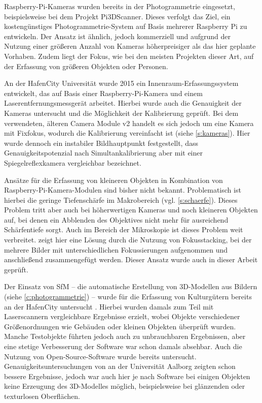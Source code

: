 \documentclass[./00PhotoBox]{subfiles}
\begin{document}
Raspberry-Pi-Kameras wurden bereits in der Photogrammetrie eingesetzt, beispielsweise bei dem Projekt Pi3DScanner. Dieses verfolgt das Ziel, ein kostengünstiges Photo\-grammetrie-System auf Basis mehrerer Raspberry Pi zu entwickeln. Der Ansatz ist ähnlich, jedoch kommerziell und aufgrund der Nutzung einer größeren Anzahl von Kameras höherpreisiger als das hier geplante Vorhaben. Zudem liegt der Fokus, wie bei den meisten Projekten dieser Art, auf der Erfassung von größeren Objekten oder Personen.
\citep{pi3dscanner}

An der HafenCity Universität wurde 2015 ein Innenraum-Erfassungssystem entwickelt, das auf Basis einer Raspberry-Pi-Kamera und einem Laserentfernungsmessgerät arbeitet. Hierbei wurde auch die Genauigkeit der Kameras untersucht und die Möglichkeit der Kalibrierung geprüft. Bei dem verwendeten, älteren Camera Module v2 handelt es sich jedoch um eine Kamera mit Fixfokus, wodurch die Kalibrierung vereinfacht ist (siehe \autoref{s:kameras}). Hier wurde dennoch ein instabiler \Gls{Bildhauptpunkt} festgestellt, dass Genauigkeitspotenzial nach Simultankalibrierung aber mit einer Spiegelreflexkamera vergleichbar bezeichnet.
\citep{3d_raspi_laserscanner}

Ansätze für die Erfassung von kleineren Objekten in Kombination von Raspberry-Pi-Kamera-Modulen sind bisher nicht bekannt. Problematisch ist hierbei die geringe Tiefenschärfe im Makrobereich (vgl. \autoref{s:schaerfe}). Dieses Problem tritt aber auch bei höherwertigen Kameras und noch kleineren Objekten auf, bei denen ein Abblenden des Objektives nicht mehr für ausreichend Schärfentiefe sorgt. Auch im Bereich der Mikroskopie ist dieses Problem weit verbreitet. \cite{focusstack_sfm} zeigt hier eine Lösung durch die Nutzung von Fokusstacking, bei der mehrere Bilder mit unterschiedlichen Fokussierungen aufgenommen und anschließend zusammengefügt werden. Dieser Ansatz wurde auch in dieser Arbeit geprüft.

Der Einsatz von \acrfull{SfM} -- die automatische Erstellung von 3D-Modellen aus Bildern (siehe \autoref{c:photogrammetrie}) -- wurde für die Erfassung von Kulturgütern bereits \citeyear{kersten2012} an der HafenCity untersucht \citep{kersten2012}. Hierbei wurden damals zum Teil mit Laserscannern vergleichbare Ergebnisse erzielt, wobei Objekte verschiedener Größenordnungen wie Gebäuden oder kleinen Objekten überprüft wurden. Manche Testobjekte führten jedoch auch zu unbrauchbaren Ergebnissen, aber eine stetige Verbesserung der Software war schon damals absehbar. Auch die Nutzung von Open-Source-Software wurde bereits untersucht. Genauigkeitsuntersuchungen von \cite{IvanNikolov} an der Universität Aalborg zeigten schon bessere Ergebnisse, jedoch war auch hier je nach Software bei einigen Objekten keine Erzeugung des 3D-Modelles möglich, beispielsweise bei glänzenden oder texturlosen Oberflächen.

\biblio
\end{document}
